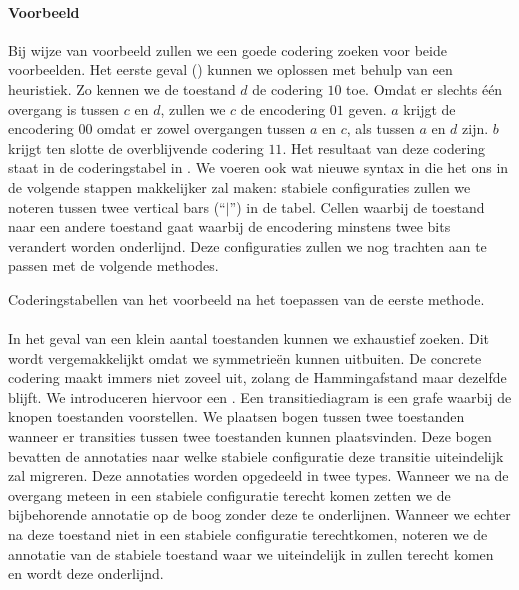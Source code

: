 \paragraph{Voorbeeld}
Bij wijze van voorbeeld zullen we een goede codering zoeken voor beide voorbeelden. Het eerste geval () kunnen we oplossen met behulp van een heuristiek. Zo kennen we de toestand $d$ de codering $10$ toe. Omdat er slechts \'e\'en overgang is tussen $c$ en $d$, zullen we $c$ de encodering $01$ geven. $a$ krijgt de encodering $00$ omdat er zowel overgangen tussen $a$ en $c$, als tussen $a$ en $d$ zijn. $b$ krijgt ten slotte de overblijvende codering $11$. Het resultaat van deze codering staat in de coderingstabel in . We voeren ook wat nieuwe syntax in die het ons in de volgende stappen makkelijker zal maken: stabiele configuraties zullen we noteren tussen twee vertical bars (``$|$'') in de tabel. Cellen waarbij de toestand naar een andere toestand gaat waarbij de encodering minstens twee bits verandert worden onderlijnd. Deze configuraties zullen we nog trachten aan te passen met de volgende methodes.
\begin{table}[hbt]
\centering
{}
\caption{Coderingstabellen van het voorbeeld na het toepassen van de eerste methode.}
\end{table}
\paragraph{}
In het geval van een klein aantal toestanden kunnen we exhaustief zoeken. Dit wordt vergemakkelijkt omdat we symmetrie\"en kunnen uitbuiten. De concrete codering maakt immers niet zoveel uit, zolang de Hammingafstand maar dezelfde blijft. We introduceren hiervoor een . Een transitiediagram is een grafe waarbij de knopen toestanden voorstellen. We plaatsen bogen tussen twee toestanden wanneer er transities tussen twee toestanden kunnen plaatsvinden. Deze bogen bevatten de annotaties naar welke stabiele configuratie deze transitie uiteindelijk zal migreren. Deze annotaties worden opgedeeld in twee types. Wanneer we na de overgang meteen in een stabiele configuratie terecht komen zetten we de bijbehorende annotatie op de boog zonder deze te onderlijnen. Wanneer we echter na deze toestand niet in een stabiele configuratie terechtkomen, noteren we de annotatie van de stabiele toestand waar we uiteindelijk in zullen terecht komen en wordt deze onderlijnd.
